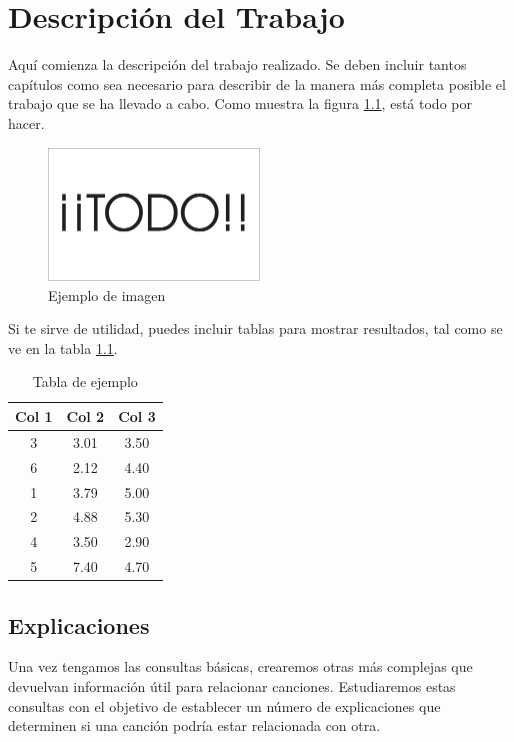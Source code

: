 \chapter{Descripción del Trabajo}
\label{cap:descripcionTrabajo}

Aquí comienza la descripción del trabajo realizado. Se deben incluir tantos capítulos como sea necesario para describir de la manera más completa posible el trabajo que se ha llevado a cabo. Como muestra la figura \ref{fig:sampleImage}, está todo por hacer.

\begin{figure}[h]
	\centering
	\includegraphics[width = 0.5\textwidth]{Imagenes/Vectorial/Todo.pdf}
	\caption{Ejemplo de imagen}
	\label{fig:sampleImage}
\end{figure}

Si te sirve de utilidad,  puedes incluir tablas para mostrar resultados, tal como se ve en la tabla \ref{tab:sampleTable}.


\begin{table}[h]
	\centering
	\begin{tabular}{c|c|c}
		\textbf{Col 1} & \textbf{Col 2} & \textbf{Col 3} \\
		\hline\hline
		3 & 3.01 & 3.50\\
		6 & 2.12 & 4.40\\
		1 & 3.79 & 5.00\\
		2 & 4.88 & 5.30\\
		4 & 3.50 & 2.90\\
		5 & 7.40 & 4.70\\
		\hline
	\end{tabular}
	\caption{Tabla de ejemplo}
	\label{tab:sampleTable}
\end{table}

\section{Explicaciones}

Una vez tengamos las consultas básicas, crearemos otras más complejas que devuelvan información útil para relacionar canciones. Estudiaremos estas consultas con el objetivo de establecer un número de explicaciones que determinen si una canción podría estar relacionada con otra.

